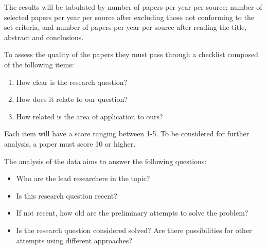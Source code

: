 \documentclass[]{article}
\begin{document}
The results will be tabulated by number of papers per year per source; number of selected papers per year per source after excluding those not conforming to the set criteria, and number of papers per year per source after reading the title, abstract and conclusions.

To assess the quality of the papers they must pass through a checklist composed of the following items:

\begin{enumerate}
\item How clear is the research question?
\item How does it relate to our question?
\item How related is the area of application to ours?
\end{enumerate}

Each item will have a score ranging between 1-5. To be considered for further analysis, a paper must score 10 or higher.

The analysis of the data aims to answer the following questions:

\begin{itemize}
\item Who are the lead researchers in the topic?
\item Is this research question recent?
\item If not recent, how old are the preliminary attempts to solve the problem?
\item Is the research question considered solved? Are there possibilities for other attempts using different approaches?
\end{itemize}
\end{document}
